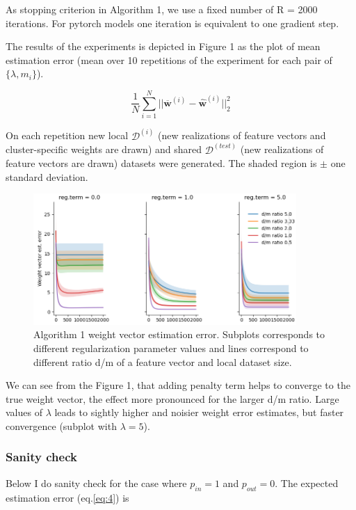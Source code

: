 \documentclass{article}
\begin{document}
As stopping criterion in Algorithm 1, we use a fixed number of R = 2000 iterations. 
For pytorch models one iteration is equivalent to one gradient step.

The results of the experiments is depicted in Figure 1 as the plot of mean estimation error (mean over 10 repetitions of the experiment for each pair of $\{\lambda, m_i \}$).

\begin{equation} \label{eq:4}
\frac{1}{N} \sum_{i=1}^{N} ||\mathbf{\overline{w}}^{(i)} - \mathbf{\widehat{w}}^{(i)}||^2_2
\end{equation}

On each repetition new local $\mathcal{D}^{(i)}$ (new realizations of feature vectors and cluster-specific weights are drawn) and shared $\mathcal{D}^{(test)}$ (new realizations of feature vectors are drawn) datasets were generated. The shaded region is $\pm$ one standard deviation.  

\begin{figure}[h]
\includegraphics[width=10cm]{Linreg_Torch_637015_est_error copy.png}
\caption{Algorithm 1 weight vector estimation error. Subplots corresponds to different regularization parameter values and lines correspond to different ratio d/m of a feature vector and local dataset size.}
\end{figure}

We can see from the Figure 1, that adding penalty term helps to converge to the true weight vector, the effect more pronounced for the larger d/m ratio. Large values of $\lambda$ leads to sightly higher and noisier weight error estimates, but faster convergence (subplot with $\lambda=5$). 

\newpage
\subsubsection{Sanity check}
Below I do sanity check for the case where $p_{in}=1$ and $p_{out}=0$. The expected estimation error (eq.\ref{eq:4}) is  
\end{document}
